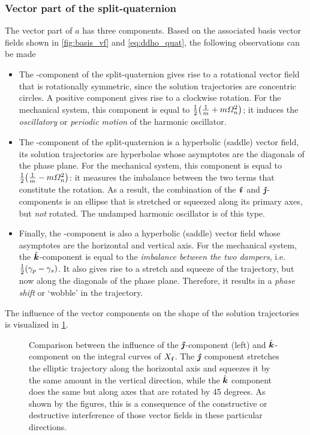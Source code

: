 \subsubsection{Vector part of the split-quaternion} 
The vector part of \(a\) has three components. Based on the associated basis vector fields shown in \cref{fig:basis_vf} and \cref{eq:ddho_quat}, the following observations can be made
\begin{itemize}
    \item The \quati-component of the split-quaternion gives rise to a rotational vector field that is rotationally symmetric, since the solution trajectories are concentric circles. A positive component gives rise to a clockwise rotation. For the mechanical system, this component is equal to \(\frac{1}{2}\qty(\tfrac{1}{m} + m\Omega_n^2)\); it induces the \emph{oscillatory} or \emph{periodic motion} of the harmonic oscillator.
    \item The \quatj-component of the split-quaternion is a hyperbolic (saddle) vector field, its solution trajectories are hyperbolae whose asymptotes are the diagonals of the phase plane. For the mechanical system, this component is equal to \(\tfrac{1}{2}\qty(\tfrac{1}{m} - m\Omega_n^2)\): it measures the imbalance between the two terms that constitute the rotation. As a result, the combination of the \(\quati\) and \(\quatj\)-components is an ellipse that is stretched or squeezed along its primary axes, but \emph{not} rotated. The undamped harmonic oscillator is of this type.
    \item Finally, the \quatk-component is also a hyperbolic (saddle) vector field whose asymptotes are the horizontal and vertical axis. For the mechanical system, the \(\quatk\)-component is equal to the \emph{imbalance between the two dampers}, i.e. \(\frac{1}{2}\qty(\gamma_p - \gamma_s)\). It also gives rise to a stretch and squeeze of the trajectory, but now along the diagonals of the phase plane. Therefore, it results in a \emph{phase shift} or `wobble' in the trajectory.
\end{itemize}
The influence of the vector components on the shape of the solution trajectories is visualized in \cref{fig:vector_components}.

\begin{figure}[ht]
    \centering
    
    \caption{Comparison between the influence of the \(\quatj\)-component (left) and \(\quatk\)-component on the integral curves of \(X_\quati\). The \(\quatj\) component stretches the elliptic trajectory along the horizontal axis and squeezes it by the same amount in the vertical direction, while the \(\quatk\) component does the same but along axes that are rotated by 45 degrees. As shown by the figures, this is a consequence of the constructive or destructive interference of those vector fields in these particular directions.}
    \label{fig:vector_components}
\end{figure}

